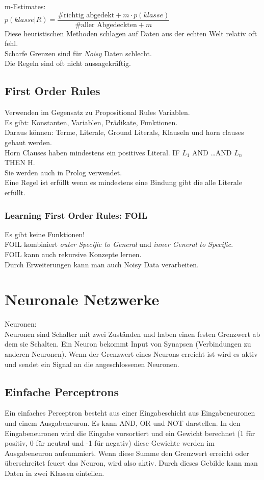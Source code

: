 \documentclass[a4paper]{scrartcl}
\begin{document}
m-Estimates:\\
$p(klasse|R) = \dfrac{\#\mbox{richtig abgedekt} +m \cdot p(klasse)}{\#\mbox{aller Abgedeckten}+m}$\\

Diese heuristischen Methoden schlagen auf Daten aus der echten Welt relativ oft fehl.\\
Scharfe Grenzen sind für \textit{Noisy} Daten schlecht.\\
Die Regeln sind oft nicht aussagekräftig.

\subsection{First Order Rules}
Verwenden im Gegensatz zu Propositional Rules Variablen.\\
Es gibt: Konstanten, Variablen, Prädikate, Funktionen.\\
Daraus können: Terme, Literale, Ground Literals, Klauseln und horn clauses gebaut werden.\\
Horn Clauses haben mindestens ein positives Literal. IF $L_1$ AND \dots AND $L_n$ THEN H.\\
Sie werden auch in Prolog verwendet.\\
Eine Regel ist erfüllt wenn es mindestens eine Bindung gibt die alle Literale erfüllt.

\subsubsection{Learning First Order Rules: FOIL}
Es gibt keine Funktionen!\\
FOIL kombiniert \textit{outer Specific to General} und \textit{inner General to Specific}.\\
FOIL kann auch rekursive Konzepte lernen.\\
Durch Erweiterungen kann man auch Noisy Data verarbeiten.

\section{Neuronale Netzwerke}
Neuronen:\\
Neuronen sind Schalter mit zwei Zuständen und haben einen festen Grenzwert ab dem sie Schalten. Ein Neuron bekommt Input von Synapsen (Verbindungen zu anderen Neuronen). Wenn der Grenzwert eines Neurons erreicht ist wird es aktiv und sendet ein Signal an die angeschlossenen Neuronen.

\subsection{Einfache Perceptrons}
Ein einfaches Perceptron besteht aus einer Eingabeschicht aus Eingabeneuronen und einem Ausgabeneuron. Es kann AND, OR und NOT darstellen. In den Eingabeneuronen wird die Eingabe vorsortiert und ein Gewicht berechnet (1 für positiv, 0 für neutral und -1 für negativ) diese Gewichte werden im Ausgabeneuron aufsummiert. Wenn diese Summe den Grenzwert erreicht oder überschreitet feuert das Neuron, wird also aktiv. Durch dieses Gebilde kann man Daten in zwei Klassen einteilen. \\
\end{document}
